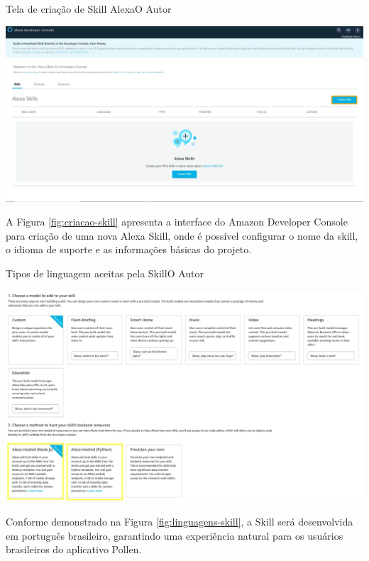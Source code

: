 \begin{figura}{Tela de criação de Skill Alexa}{O Autor}
    \begin{flushleft}
        \label{fig:criacao-skill}
        \includegraphics[width=0.85\linewidth]{resources/floats/ilustracoes/tela_criacao_skill_alexa.png}
    \end{flushleft}
\end{figura}

A Figura \ref{fig:criacao-skill} apresenta a interface do Amazon Developer Console para criação de uma nova Alexa Skill, onde é possível configurar o nome da skill, o idioma de suporte e as informações básicas do projeto.

\begin{figura}{Tipos de linguagem aceitas pela Skill}{O Autor}
    \begin{flushleft}
        \label{fig:linguagens-skill}
        \includegraphics[width=0.85\linewidth]{resources/floats/ilustracoes/tipos_linguagem_aceitas_skill.png}
    \end{flushleft}
\end{figura}

Conforme demonstrado na Figura \ref{fig:linguagens-skill}, a Skill será desenvolvida em português brasileiro, garantindo uma experiência natural para os usuários brasileiros do aplicativo Pollen.

